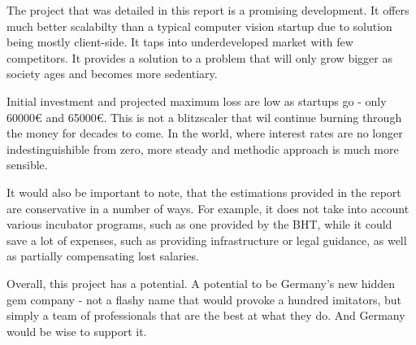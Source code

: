 The project that was detailed in this report is a promising development. It offers much better scalabilty than a typical computer vision startup due to solution being mostly client-side. It taps into underdeveloped market with few competitors. It provides a solution to a problem that will only grow bigger as society ages and becomes more sedentiary.

Initial investment and projected maximum loss are low as startups go - only 60000€ and 65000€. This is not a blitzscaler that wil continue burning through the money for decades to come. In the world, where interest rates are no longer indestinguishible from zero, more steady and methodic approach is much more sensible.

It would also be important to note, that the estimations provided in the report are conservative in a number of ways. For example, it does not take into account various incubator programs, such as one provided by the BHT, while it could save a lot of expenses, such as providing infrastructure or legal guidance, as well as partially compensating lost salaries. 

Overall, this project has a potential. A potential to be Germany's new hidden gem company - not a flashy name that would provoke a hundred imitators, but simply a team of professionals that are the best at what they do. And Germany would be wise to support it.